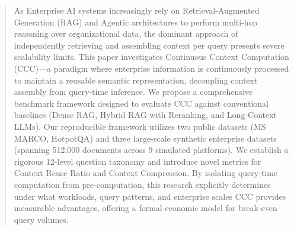 \begin{abstract}
As Enterprise AI systems increasingly rely on Retrieval-Augmented Generation (RAG) and Agentic architectures to perform multi-hop reasoning over organizational data, the dominant approach of independently retrieving and assembling context per query presents severe scalability limits. This paper investigates Continuous Context Computation (CCC)---a paradigm where enterprise information is continuously processed to maintain a reusable semantic representation, decoupling context assembly from query-time inference. We propose a comprehensive benchmark framework designed to evaluate CCC against conventional baselines (Dense RAG, Hybrid RAG with Reranking, and Long-Context LLMs). Our reproducible framework utilizes two public datasets (MS MARCO, HotpotQA) and three large-scale synthetic enterprise datasets (spanning 512,000 documents across 9 simulated platforms). We establish a rigorous 12-level question taxonomy and introduce novel metrics for Context Reuse Ratio and Context Compression. By isolating query-time computation from pre-computation, this research explicitly determines under what workloads, query patterns, and enterprise scales CCC provides measurable advantages, offering a formal economic model for break-even query volumes.
\end{abstract}
